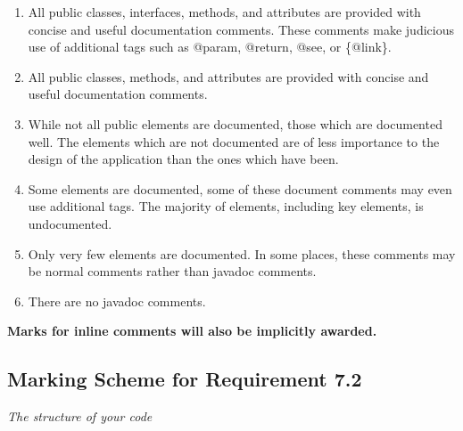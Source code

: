 \documentclass[11pt]{article}
\begin{document}
\begin{enumerate}[label=(\Alph*)]

	\item All public classes, interfaces, methods, and attributes are provided with concise and useful documentation comments. These comments make judicious use of additional tags such as @param, @return, @see, or \{@link\}.

	\item All public classes, methods, and attributes are provided with concise and useful documentation comments.

	\item While not all public elements are documented, those which are documented well. The elements which are not documented are of less importance to the design of the application than the ones which have been.

	\item Some elements are documented, some of these document comments may even use additional tags. The majority of elements, including key elements, is undocumented.

	\item Only very few elements are documented. In some places, these comments may be normal comments rather than javadoc comments.

	\item There are no javadoc comments.

\end{enumerate}

\textbf{Marks for inline comments will also be implicitly awarded.}

\subsection{Marking Scheme for Requirement 7.2}

\emph{The structure of your code}
\end{document}
